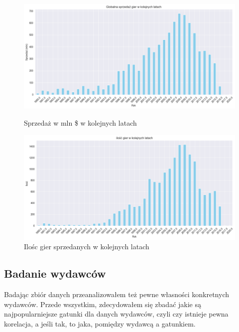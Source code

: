 \documentclass[11pt]{article}
\begin{document}
\begin{figure}[H]
    \centering
    \begin{minipage}[t]{0.48\linewidth}
        \centering
        \includegraphics[width=\linewidth]{figures/Lata-sprzedaz}
        \caption{Sprzedaż w mln \$ w kolejnych latach}
        \label{fig:sprzedaz}
    \end{minipage}
    \hfill
    \begin{minipage}[t]{0.48\linewidth}
        \centering
        \includegraphics[width=\linewidth]{figures/Lata-ilosc}
        \caption{Ilośc gier sprzedanych w kolejnych latach}
        \label{fig:sprzedaz2}
    \end{minipage}
\end{figure}


\subsection{Badanie wydawców}\label{subsec:badanie-wydawcow}

Badając zbiór danych przeanalizowałem też pewne własności konkretnych wydawców.
Przede wszystkim, zdecydowałem się zbadać jakie są najpopularniejsze gatunki dla danych wydawców, czyli czy istnieje pewna korelacja, a jeśli tak, to jaka, pomiędzy wydawcą a gatunkiem.
\end{document}
